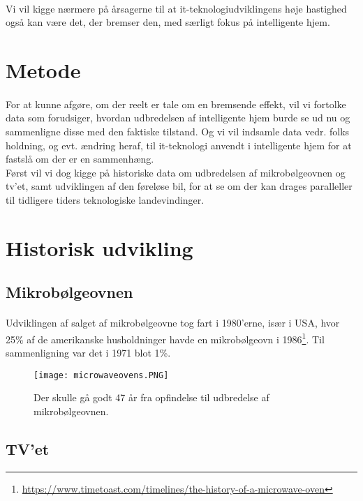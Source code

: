 \documentclass{article}
\begin{document}
\paragraph{}
Vi vil kigge nærmere på årsagerne til at it-teknologiudviklingens høje hastighed også kan være det, der bremser den, med særligt fokus på intelligente hjem.
\section{Metode}
\paragraph{}
For at kunne afgøre, om der reelt er tale om en bremsende effekt, vil vi fortolke 
data som forudsiger, hvordan udbredelsen af intelligente hjem burde se ud nu og 
sammenligne disse med den faktiske tilstand. Og vi vil indsamle data vedr. folks holdning, og evt. ændring heraf, til it-teknologi anvendt i intelligente hjem for at fastslå om der er en sammenhæng.\\
Først vil vi dog kigge på historiske data om udbredelsen af mikrobølgeovnen og tv'et, samt udviklingen af den føreløse bil, for at se om der kan drages paralleller til tidligere tiders teknologiske landevindinger.
\section{Historisk udvikling}
\subsection{Mikrobølgeovnen}
\paragraph{}
Udviklingen af salget af mikrobølgeovne tog fart i 1980'erne, især i USA, hvor 25\% af de amerikanske husholdninger havde en mikrobølgeovn i 1986\footnote{\url{https://www.timetoast.com/timelines/the-history-of-a-microwave-oven}}.
Til sammenligning var det i 1971 blot 1\%.
\begin{figure}[htb]
    \centering
    \texttt{[image: microwaveovens.PNG]}
    \caption{Der skulle gå godt 47 år fra opfindelse til udbredelse af mikrobølgeovnen.}
    \label{fig:microwaveovens}
\end{figure}
\subsection{TV'et}
\end{document}

